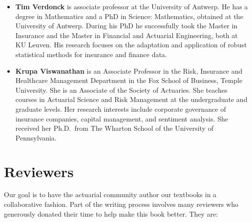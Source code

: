 \documentclass[]{book}
\providecommand{\tightlist}{%
  \setlength{\itemsep}{0pt}\setlength{\parskip}{0pt}}
\begin{document}
\begin{itemize}
\tightlist
\item
  \textbf{Tim Verdonck} is associate professor at the University of
  Antwerp. He has a degree in Mathematics and a PhD in Science:
  Mathematics, obtained at the University of Antwerp. During his PhD he
  successfully took the Master in Insurance and the Master in Financial
  and Actuarial Engineering, both at KU Leuven. His research focuses on
  the adaptation and application of robust statistical methods for
  insurance and finance data.
\end{itemize}

\begin{itemize}
\tightlist
\item
  \textbf{Krupa Viswanathan} is an Associate Professor in the Risk,
  Insurance and Healthcare Management Department in the Fox School of
  Business, Temple University. She is an Associate of the Society of
  Actuaries. She teaches courses in Actuarial Science and Risk
  Management at the undergraduate and graduate levels. Her research
  interests include corporate governance of insurance companies, capital
  management, and sentiment analysis. She received her Ph.D.~from The
  Wharton School of the University of Pennsylvania.
\end{itemize}

\section*{Reviewers}\label{reviewers}

Our goal is to have the actuarial community author our textbooks in a
collaborative fashion. Part of the writing process involves many
reviewers who generously donated their time to help make this book
better. They are:
\end{document}
